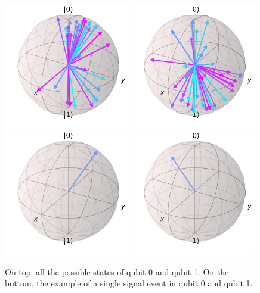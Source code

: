 \begin{figure}[!htbp]
\centering
    \includegraphics[width=0.49\textwidth]{../assets_dev/bloch1.pdf}
    \includegraphics[width=0.49\textwidth]{../assets_dev/bloch2.pdf} \\
    \includegraphics[width=0.49\textwidth]{../assets_dev/bloch_event1360_1.pdf}
    \includegraphics[width=0.49\textwidth]{../assets_dev/bloch_event1360_2.pdf} \\
\caption{On top: all the possible states of qubit 0 and qubit 1. On the bottom,
the example of a single signal event in qubit 0 and qubit 1.}
\label{fig:features_qubits}
\end{figure}

